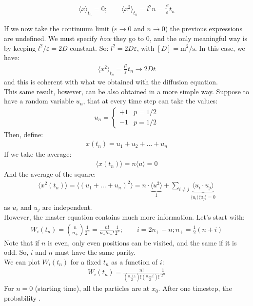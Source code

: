 \documentclass[../template.tex]{subfiles}
\begin{document}
\begin{align*}
    \langle x \rangle_{t_n} = 0; \qquad \langle x^2 \rangle_{t_n} = l^2 n = \frac{l^2}{\varepsilon} t_n
\end{align*}

If we now take the continuum limit ($\varepsilon \to 0$ and $n \to 0$) the previous expressions are undefined. We must specify \textit{how} they go to $0$, and the only meaningful way is by keeping $l^2/\varepsilon = 2D$ constant. So: $l^2 = 2D \varepsilon$, with $[D] = \si{\m\squared\per\s}$. In this case, we have: 
\begin{align*}
    \langle x^2 \rangle_{t_n} = \frac{l^2}{\varepsilon} t_n \to 2D t
\end{align*}
and this is coherent with what we obtained with the diffusion equation.\\

This same result, however, can be also obtained in a more simple way. Suppose to have a random variable $u_n$, that at every time step can take the values: 
\begin{align*}
    u_n = \begin{cases}
        +1 & p = 1/2\\
        -1 & p = 1/2
    \end{cases}
\end{align*} 
Then, define: 
\begin{align*}
    x(t_n) = u_1 + u_2 + \dots + u_n
\end{align*}
If we take the average: 
\begin{align*}
    \langle x(t_n) \rangle = n\langle u \rangle = 0
\end{align*}
And the average of the square: 
\begin{align*}
    \langle x^2 (t_n)\rangle = \langle (u_1 + \dots + u_n)^2 \rangle = n\cdot \underbrace{\langle u^2 \rangle}_{1} + \sum_{i\neq j} \underbrace{\langle u_i \cdot u_j \rangle}_{\langle u_i \rangle \langle u_j\rangle = 0}
\end{align*}
as $u_i$ and $u_j$ are independent.\\

However, the master equation contains much more information. Let's start with: 
\begin{align*}
    W_i(t_n) = {n \choose n_+} \frac{1}{2^n} = \frac{n!}{n_+! n_-!} \frac{1}{2^n}; \qquad i=2n_+ - n; n_+ = \frac{1}{2}(n+i)
\end{align*}
Note that if $n$ is even, only even positions can be visited, and the same if it is odd. So, $i$ and $n$ must have the same parity.\\
We can plot $W_i(t_n)$ for a fixed $t_n$ as a function of $i$:
\begin{align*}
    W_i(t_n) = \frac{n!}{\left(\frac{n+i}{2}\right)! \left(\frac{n-i}{2}\right)!} \frac{1}{2^n}
\end{align*}   
For $n=0$ (starting time), all the particles are at $x_0 $. After one timestep, the probability . %
\end{document}
